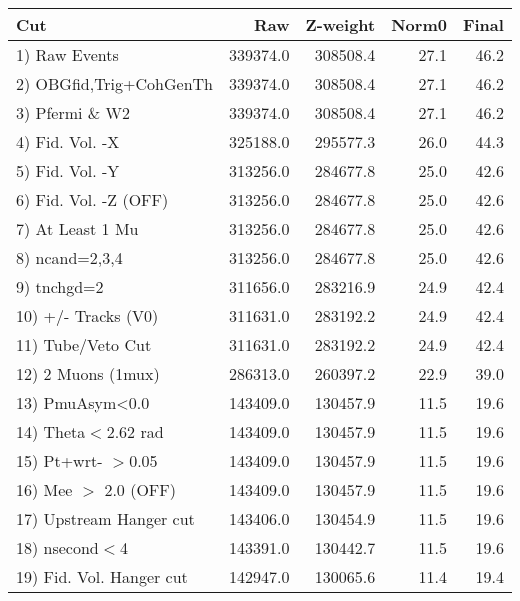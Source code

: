  \begin{table}[h!]\centering
 \begin{tabular}{||l||r|r|r|r||}
 \hline
 \hline
 Cut & Raw & Z-weight & Norm0 & Final \\
 \hline
  1) Raw Events           &    339374.0 &    308508.4 &        27.1 &        46.2 \\
  2) OBGfid,Trig+CohGenTh &    339374.0 &    308508.4 &        27.1 &        46.2 \\
  3) Pfermi \& W2         &    339374.0 &    308508.4 &        27.1 &        46.2 \\
  4) Fid. Vol. -X         &    325188.0 &    295577.3 &        26.0 &        44.3 \\
  5) Fid. Vol. -Y         &    313256.0 &    284677.8 &        25.0 &        42.6 \\
  6) Fid. Vol. -Z (OFF)   &    313256.0 &    284677.8 &        25.0 &        42.6 \\
  7) At Least 1 Mu        &    313256.0 &    284677.8 &        25.0 &        42.6 \\
  8) ncand=2,3,4          &    313256.0 &    284677.8 &        25.0 &        42.6 \\
  9) tnchgd=2             &    311656.0 &    283216.9 &        24.9 &        42.4 \\
 10) +/- Tracks (V0)      &    311631.0 &    283192.2 &        24.9 &        42.4 \\
 11) Tube/Veto Cut        &    311631.0 &    283192.2 &        24.9 &        42.4 \\
 12) 2 Muons (1mux)       &    286313.0 &    260397.2 &        22.9 &        39.0 \\
 13) PmuAsym<0.0          &    143409.0 &    130457.9 &        11.5 &        19.6 \\
 14) Theta$<$2.62 rad     &    143409.0 &    130457.9 &        11.5 &        19.6 \\
 15) Pt+wrt- $>$0.05      &    143409.0 &    130457.9 &        11.5 &        19.6 \\
 16) Mee $>$ 2.0  (OFF)   &    143409.0 &    130457.9 &        11.5 &        19.6 \\
 17) Upstream Hanger cut  &    143406.0 &    130454.9 &        11.5 &        19.6 \\
 18) nsecond$<$4          &    143391.0 &    130442.7 &        11.5 &        19.6 \\
 19) Fid. Vol. Hanger cut &    142947.0 &    130065.6 &        11.4 &        19.4 \\

\end{tabular}
\end{table}
